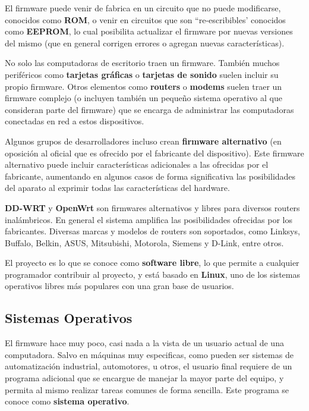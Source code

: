 El firmware puede venir de fabrica en un circuito que no puede modificarse,
conocidos como \textbf{ROM}, o venir en circuitos que son ``re-escribibles'
conocidos como \textbf{EEPROM}, lo cual posibilita actualizar el firmware por
nuevas versiones del mismo (que en general corrigen errores o agregan nuevas
características).

No solo las computadoras de escritorio traen un firmware. También muchos
periféricos como \textbf{tarjetas gráficas} o \textbf{tarjetas de sonido} suelen
incluir su propio firmware. Otros elementos como \textbf{routers} o
\textbf{modems} suelen traer un firmware complejo (o incluyen también un pequeño
sistema operativo al que consideran parte del firmware) que se
encarga de administrar las computadoras conectadas en red a estos dispositivos.

Algunos grupos de desarrolladores incluso crean \textbf{firmware alternativo}
(en oposición al oficial que es ofrecido por el fabricante del dispositivo).
Este firmware alternativo puede incluir características adicionales
a las ofrecidas por el fabricante, aumentando en algunos casos de forma
significativa las posibilidades del aparato al exprimir todas las
características del hardware.

\begin{knowwhat}
    \textbf{DD-WRT} y \textbf{OpenWrt} son firmwares alternativos y libres para
    diversos routers inalámbricos. En general el sistema amplifica las
    posibilidades ofrecidas por los fabricantes. Diversas marcas y modelos de
    routers son soportados, como Linksys, Buffalo, Belkin, ASUS, Mitsubishi,
    Motorola, Siemens y D-Link, entre otros.

    El proyecto es lo que se conoce como \textbf{software libre}, lo que permite
    a cualquier programador contribuir al proyecto, y está basado en \textbf{Linux},
    uno de los sistemas operativos libres más populares con una gran base de usuarios.
\end{knowwhat}


\subsection{Sistemas Operativos}

El firmware hace muy poco, casi nada a la vista de un usuario actual de una
computadora. Salvo en máquinas muy especificas, como pueden ser sistemas de
automatización industrial, automotores, u otros, el usuario final requiere de
un programa adicional que se encargue de manejar la mayor parte del equipo, y
permita al mismo realizar tareas comunes de forma sencilla. Este programa se
conoce como \textbf{sistema operativo}.

